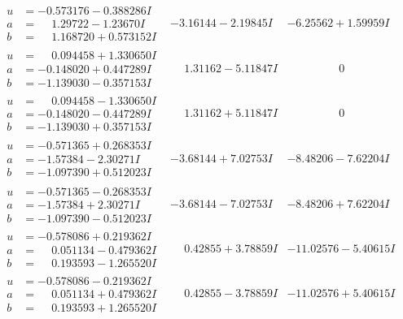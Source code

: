 \documentclass[1p]{elsarticle_modified}
\theoremstyle{definition}
\begin{document}
$$\begin{array}{c|c|c}
\begin{aligned}
u &= -0.573176 - 0.388286 I \\
a &= \phantom{-}1.29722 - 1.23670 I \\
b &= \phantom{-}1.168720 + 0.573152 I\end{aligned}
 & -3.16144 - 2.19845 I & -6.25562 + 1.59959 I \\ \hline\begin{aligned}
u &= \phantom{-}0.094458 + 1.330650 I \\
a &= -0.148020 + 0.447289 I \\
b &= -1.139030 - 0.357153 I\end{aligned}
 & \phantom{-}1.31162 - 5.11847 I & \phantom{-0.000000 } 0 \\ \hline\begin{aligned}
u &= \phantom{-}0.094458 - 1.330650 I \\
a &= -0.148020 - 0.447289 I \\
b &= -1.139030 + 0.357153 I\end{aligned}
 & \phantom{-}1.31162 + 5.11847 I & \phantom{-0.000000 } 0 \\ \hline\begin{aligned}
u &= -0.571365 + 0.268353 I \\
a &= -1.57384 - 2.30271 I \\
b &= -1.097390 + 0.512023 I\end{aligned}
 & -3.68144 + 7.02753 I & -8.48206 - 7.62204 I \\ \hline\begin{aligned}
u &= -0.571365 - 0.268353 I \\
a &= -1.57384 + 2.30271 I \\
b &= -1.097390 - 0.512023 I\end{aligned}
 & -3.68144 - 7.02753 I & -8.48206 + 7.62204 I \\ \hline\begin{aligned}
u &= -0.578086 + 0.219362 I \\
a &= \phantom{-}0.051134 - 0.479362 I \\
b &= \phantom{-}0.193593 - 1.265520 I\end{aligned}
 & \phantom{-}0.42855 + 3.78859 I & -11.02576 - 5.40615 I \\ \hline\begin{aligned}
u &= -0.578086 - 0.219362 I \\
a &= \phantom{-}0.051134 + 0.479362 I \\
b &= \phantom{-}0.193593 + 1.265520 I\end{aligned}
 & \phantom{-}0.42855 - 3.78859 I & -11.02576 + 5.40615 I \\ \hline\begin{aligned}

\end{aligned}
\end{array}$$
\end{document}

